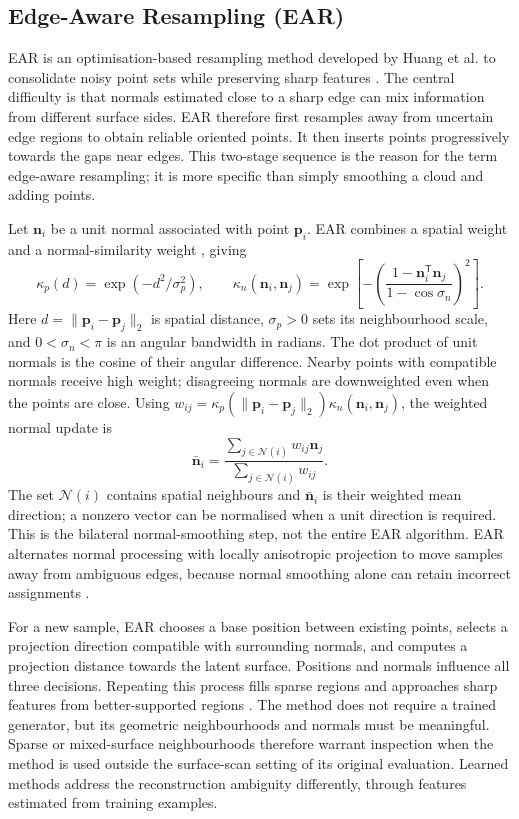 \subsection{Edge-Aware Resampling (EAR)}
\label{subsec:ear}

EAR is an optimisation-based resampling method developed by Huang et al.
to consolidate noisy point sets while preserving sharp features
\cite{huang2013ear}. The central difficulty is that normals estimated close
to a sharp edge can mix information from different surface sides. EAR
therefore first resamples away from uncertain edge regions to obtain
reliable oriented points. It then inserts points progressively towards
the gaps near edges. This two-stage sequence is the reason for the term
edge-aware resampling; it is more specific than simply smoothing a cloud
and adding points.

Let $\mathbf n_i$ be a unit normal associated with point $\mathbf p_i$.
EAR combines a spatial weight and a normal-similarity weight
\cite{huang2013ear}, giving
\begin{equation}
 \kappa_p(d)=\exp(-d^2/\sigma_p^2),\qquad
 \kappa_n(\mathbf n_i,\mathbf n_j)
 =\exp\left[-\left(\frac{1-\mathbf n_i^{\mathsf T}\mathbf n_j}
 {1-\cos\sigma_n}\right)^2\right].
 \label{eq:ear_kernels}
\end{equation}
Here $d=\|\mathbf p_i-\mathbf p_j\|_2$ is spatial distance,
$\sigma_p>0$ sets its neighbourhood scale, and $0<\sigma_n<\pi$ is an angular
bandwidth in radians. The dot product of unit normals is the cosine of their angular
difference. Nearby points with compatible normals receive high weight;
disagreeing normals are downweighted even when the points are close.
Using $w_{ij}=\kappa_p(\|\mathbf p_i-\mathbf p_j\|_2)
\kappa_n(\mathbf n_i,\mathbf n_j)$, the weighted normal update is
\begin{equation}
 \bar{\mathbf n}_i=
 \frac{\sum_{j\in\mathcal N(i)}w_{ij}\mathbf n_j}
 {\sum_{j\in\mathcal N(i)}w_{ij}}.
 \label{eq:ear_normal_filter}
\end{equation}
The set $\mathcal N(i)$ contains spatial neighbours and $\bar{\mathbf n}_i$
is their weighted mean direction; a nonzero vector can be normalised when
a unit direction is required. This is the bilateral normal-smoothing step,
not the entire EAR algorithm. EAR alternates normal processing with locally
anisotropic projection to move samples away from ambiguous edges, because
normal smoothing alone can retain incorrect assignments
\cite{huang2013ear}.

For a new sample, EAR chooses a base position between existing points,
selects a projection direction compatible with surrounding normals, and
computes a projection distance towards the latent surface. Positions and
normals influence all three decisions. Repeating this process fills sparse
regions and approaches sharp features from better-supported regions
\cite{huang2013ear}. The method does not require a trained generator, but
its geometric neighbourhoods and normals must be meaningful. Sparse or
mixed-surface neighbourhoods therefore warrant inspection when the method
is used outside the surface-scan setting of its original evaluation.
Learned methods address the reconstruction ambiguity differently, through
features estimated from training examples.

